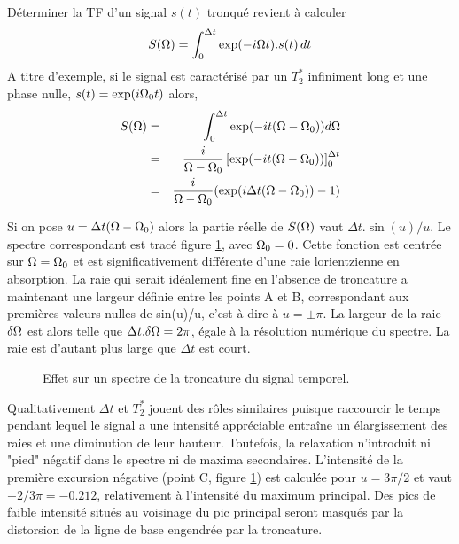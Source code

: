 Déterminer la TF d'un signal $s(t)$ tronqué revient à calculer 
\begin{equation}
S(\Omega) = \int_0^{\Delta t} \exp(-i \Omega t). s(t) \, dt
\end{equation}
A titre d'exemple, si le signal est caractérisé par un $T_2^*$ infiniment long et une phase 
nulle, $s(t) = \exp(i \Omega_0 t)$ alors,
\begin{eqnarray}
S(\Omega) & = & \int_0^{\Delta t} \exp(-i t (\Omega - \Omega_0)) d\Omega \\
& = & \frac{i}{\Omega - \Omega_0} \left[ \exp(-i t(\Omega-\Omega_0))\right]_0^{\Delta t} \\
& = & \frac{i}{\Omega - \Omega_0} (\exp(i \Delta t (\Omega-\Omega_0))-1)
\end{eqnarray}

Si on pose $u = \Delta t (\Omega -\Omega_0)$ alors la partie réelle de 
$S(\Omega)$ vaut $\Delta t . \sin(u)/u$. 
Le spectre correspondant est tracé figure \ref{fig:sinc}, avec $\Omega_0 = 0$.
Cette fonction est centrée sur $\Omega = \Omega_0$ et est significativement
différente d'une raie lorientzienne en absorption. 
La raie qui serait idéalement fine en l'absence de troncature 
a maintenant une largeur définie 
entre les points A et B, correspondant aux premières valeurs nulles de sin(u)/u, 
c'est-à-dire à $u = \pm\pi$. 
La largeur de la raie $\delta\Omega$ est alors telle que $\Delta t.\delta\Omega = 2 \pi$,
égale à la résolution numérique du spectre.
La raie est d'autant plus large que $\Delta t$ est court.

\begin{figure}[hbt]
\begin{center}
\end{center}
\caption{Effet sur un spectre de la troncature du signal temporel.}
\label{fig:sinc}
\end{figure}

Qualitativement $\Delta t$ et $T_2^*$ 
jouent des rôles similaires puisque raccourcir le temps pendant lequel le signal a une 
intensité appréciable entraîne un élargissement des raies et une diminution de leur 
hauteur.
Toutefois, la relaxation n'introduit ni "pied" négatif dans le spectre ni de maxima 
secondaires. L'intensité de la première excursion négative (point C, figure \ref{fig:sinc}) 
est calculée pour $u = 3\pi/2$ et vaut $-2/3\pi = -0.212$, 
relativement à l'intensité du maximum principal. 
Des pics de faible intensité situés au voisinage du pic principal 
seront masqués par la distorsion de 
la ligne de base engendrée par la troncature.


